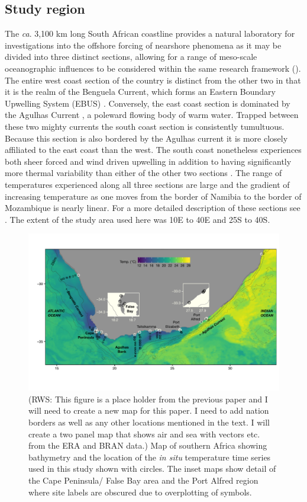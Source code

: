 \documentclass[a4paper,10pt,review]{elsarticle}
\begin{document}
\subsection{Study region}
The \emph{ca}. 3,100 km long South African coastline provides a natural laboratory for investigations into the offshore forcing of nearshore phenomena as it may be divided into three distinct sections, allowing for a range of meso-scale oceanographic influences to be considered within the same research framework (). The entire west coast section of the country is distinct from the other two in that it is the realm of the Benguela Current, which forms an Eastern Boundary Upwelling System (EBUS) \citep{Hutchings2009}. Conversely, the east coast section is dominated by the Agulhas Current \citep{Luning1990}, a poleward flowing body of warm water. Trapped between these two mighty currents the south coast section is consistently tumultuous. Because this section is also bordered by the Agulhas current it is more closely affiliated to the east coast than the west. The south coast nonetheless experiences both sheer forced and wind driven upwelling in addition to having significantly more thermal variability than either of the other two sections \citep{Schlegel2017}. The range of temperatures experienced along all three sections are large and the gradient of increasing temperature as one moves from the border of Namibia to the border of Mozambique is nearly linear. For a more detailed description of these sections see \citet{Smit2013}. The extent of the study area used here was 10\degree E to 40\degree E and 25\degree S to 40\degree S.

\begin{figure}
\includegraphics[width=1.0\textwidth]{figure_1.pdf}
\caption{(RWS: This figure is a place holder from the previous paper and I will need to create a new map for this paper. I need to add nation borders as well as any other locations mentioned in the text. I will create a two panel map that shows air and sea with vectors etc. from the ERA and BRAN data.) Map of southern Africa showing bathymetry and the location of the \emph{in situ} temperature time series used in this study shown with circles. The inset maps show detail of the Cape Peninsula/ False Bay area and the Port Alfred region where site labels are obscured due to overplotting of symbols.}
\label{figure1}
\end{figure}
\end{document}
